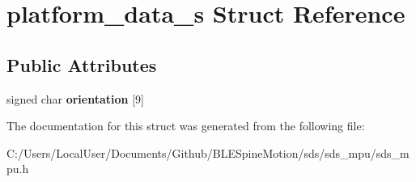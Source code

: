 \hypertarget{structplatform__data__s}{}\section{platform\+\_\+data\+\_\+s Struct Reference}
\label{structplatform__data__s}
\subsection*{Public Attributes}
\begin{DoxyCompactItemize}
\item 
\mbox{\label{structplatform__data__s_af026bc5493793c52186a72b50bebba87}} 
signed char {\bfseries orientation} \mbox{[}9\mbox{]}
\end{DoxyCompactItemize}


The documentation for this struct was generated from the following file\+:\begin{DoxyCompactItemize}
\item 
C\+:/\+Users/\+Local\+User/\+Documents/\+Github/\+B\+L\+E\+Spine\+Motion/sds/sds\+\_\+mpu/sds\+\_\+mpu.\+h\end{DoxyCompactItemize}
